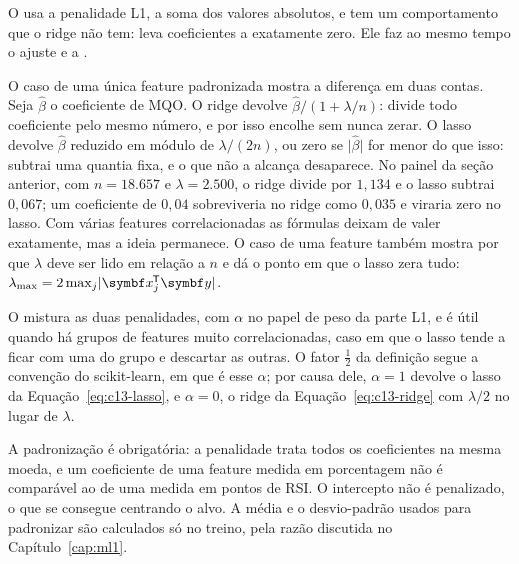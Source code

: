 O  \citep{tibshirani1996} usa a penalidade L1, a soma dos valores absolutos, e tem um comportamento que o ridge não tem: leva coeficientes a exatamente zero. Ele faz ao mesmo tempo o ajuste e a .

O caso de uma única feature padronizada mostra a diferença em duas contas. Seja $\hat\beta$ o coeficiente de MQO. O ridge devolve $\hat\beta/(1 + \lambda/n)$: divide todo coeficiente pelo mesmo número, e por isso encolhe sem nunca zerar. O lasso devolve $\hat\beta$ reduzido em módulo de $\lambda/(2n)$, ou zero se $\lvert\hat\beta\rvert$ for menor do que isso: subtrai uma quantia fixa, e o que não a alcança desaparece. No painel da seção anterior, com $n = 18.657$ e $\lambda = 2.500$, o ridge divide por $1,134$ e o lasso subtrai $0,067$; um coeficiente de $0,04$ sobreviveria no ridge como $0,035$ e viraria zero no lasso. Com várias features correlacionadas as fórmulas deixam de valer exatamente, mas a ideia permanece. O caso de uma feature também mostra por que $\lambda$ deve ser lido em relação a $n$ e dá o ponto em que o lasso zera tudo: $\lambda_{\max} = 2\max_j \lvert \vetor{x}_j\T\vetor{y}\rvert$.

O  \citep{zou2005} mistura as duas penalidades, com $\alpha$ no papel de peso da parte L1, e é útil quando há grupos de features muito correlacionadas, caso em que o lasso tende a ficar com uma do grupo e descartar as outras. O fator $\tfrac12$ da definição segue a convenção do scikit-learn, em que  é esse $\alpha$; por causa dele, $\alpha = 1$ devolve o lasso da Equação~\eqref{eq:c13-lasso}, e $\alpha = 0$, o ridge da Equação~\eqref{eq:c13-ridge} com $\lambda/2$ no lugar de $\lambda$.


A padronização é obrigatória: a penalidade trata todos os coeficientes na mesma moeda, e um coeficiente de uma feature medida em porcentagem não é comparável ao de uma medida em pontos de RSI. O intercepto não é penalizado, o que se consegue centrando o alvo. A média e o desvio-padrão usados para padronizar são calculados só no treino, pela razão discutida no Capítulo~\ref{cap:ml1}.

